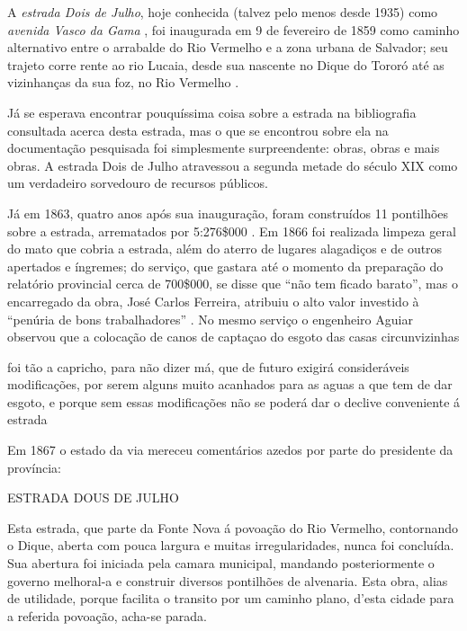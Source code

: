 A \textit{estrada Dois de Julho}, hoje conhecida (talvez pelo menos desde 1935) como \textit{avenida Vasco da Gama} \cite[p.~142]{souza_guia_1935}, foi inaugurada em 9 de fevereiro de 1859 \cite[p.~20]{silvalima_dique_1899} como caminho alternativo entre o arrabalde do Rio Vermelho e a zona urbana de Salvador; seu trajeto corre rente ao rio Lucaia, desde sua nascente no Dique do Tororó até as vizinhanças da sua foz, no Rio Vermelho \cite[p.~582]{ruy_politica_1949}.

Já se esperava encontrar pouquíssima coisa sobre a estrada na bibliografia consultada acerca desta estrada, mas o que se encontrou sobre ela na documentação pesquisada foi simplesmente surpreendente: obras, obras e mais obras. A estrada Dois de Julho atravessou a segunda metade do século XIX como um verdadeiro sorvedouro de recursos públicos.

Já em 1863, quatro anos após sua inauguração, foram construídos 11 pontilhões sobre a estrada, arrematados por 5:276\$000 \cite[p.~66]{bahia_rpe_1863b}. Em 1866 foi realizada limpeza geral do mato que cobria a estrada, além do aterro de lugares alagadiços e de outros apertados e íngremes; do serviço, que gastara até o momento da preparação do relatório provincial cerca de 700\$000, se disse que ``não tem ficado barato'', mas o encarregado da obra, José Carlos Ferreira, atribuiu o alto valor investido à ``penúria de bons trabalhadores'' \cite[p.~76]{bahia_rpe_1866}. No mesmo serviço o engenheiro Aguiar observou que a colocação de canos de captaçao do esgoto das casas circunvizinhas 

\begin{citacao}
foi tão a capricho, para não dizer má, que de futuro exigirá consideráveis modificações, por serem alguns muito acanhados para as aguas a que tem de dar esgoto, e porque sem essas modificações não se poderá dar o declive conveniente á estrada \cite[p.~76]{bahia_rpe_1866}
\end{citacao}

Em 1867 o estado da via mereceu comentários azedos por parte do presidente da província:

\begin{citacao}
ESTRADA DOUS DE JULHO

Esta estrada, que parte da Fonte Nova á povoação do Rio Vermelho, contornando o Dique, aberta com pouca largura e muitas irregularidades, nunca foi concluída. Sua abertura foi iniciada pela camara municipal, mandando posteriormente o governo melhoral-a e construir diversos pontilhões de alvenaria. 
Esta obra, alias de utilidade, porque facilita o transito por um caminho plano, d'esta cidade para a referida povoação, acha-se parada. \cite[obras publicas,~p.~9]{bahia_rpe_1867}
\end{citacao}

